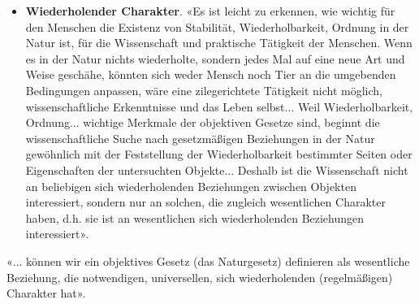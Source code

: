 \documentclass[11pt,a4paper]{article}
\begin{document}
\begin{itemize}
\item \textbf{Wiederholender Charakter}. «Es ist leicht zu erkennen, wie
  wichtig für den Menschen die Existenz von Stabilität, Wiederholbarkeit,
  Ordnung in der Natur ist, für die Wissenschaft und praktische Tätigkeit der
  Menschen. Wenn es in der Natur nichts wiederholte, sondern jedes Mal auf
  eine neue Art und Weise geschähe, könnten sich weder Mensch noch Tier an die
  umgebenden Bedingungen anpassen, wäre eine zilegerichtete Tätigkeit nicht
  möglich, wissenschaftliche Erkenntnisse und das Leben selbst... Weil
  Wiederholbarkeit, Ordnung... wichtige Merkmale der objektiven Gesetze sind,
  beginnt die wissenschaftliche Suche nach gesetzmäßigen Beziehungen in der
  Natur gewöhnlich mit der Feststellung der Wiederholbarkeit bestimmter Seiten
  oder Eigenschaften der untersuchten Objekte... Deshalb ist die Wissenschaft
  nicht an beliebigen sich wiederholenden Beziehungen zwischen Objekten
  interessiert, sondern nur an solchen, die zugleich wesentlichen Charakter
  haben, d.h. sie ist an wesentlichen sich wiederholenden Beziehungen
  interessiert».
\end{itemize}
«... können wir ein objektives Gesetz (das Naturgesetz) definieren als
wesentliche Beziehung, die notwendigen, universellen, sich wiederholenden
(regelmäßigen) Charakter hat».
\end{document}
